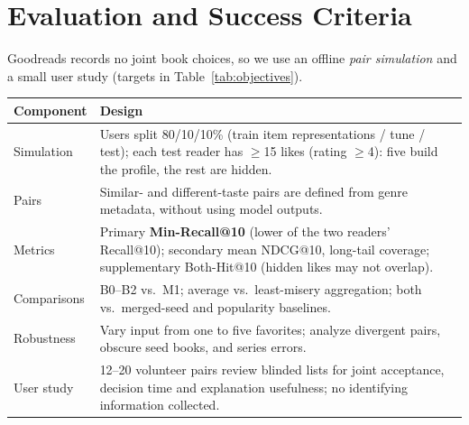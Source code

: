 \section*{Evaluation and Success Criteria}
Goodreads records no joint book choices, so we use an offline \emph{pair simulation} and a small user study (targets in Table~\ref{tab:objectives}).

{\tablestyle
\begin{xltabular}{\linewidth}{@{}L{2.0cm}Y@{}}
\toprule
\textbf{Component} & \textbf{Design} \\
\midrule
Simulation & Users split 80/10/10\% (train item representations / tune / test); each test reader has $\geq$15 likes (rating $\geq$4): five build the profile, the rest are hidden. \\
Pairs & Similar- and different-taste pairs are defined from genre metadata, without using model outputs. \\
Metrics & Primary \textbf{Min-Recall@10} (lower of the two readers' Recall@10); secondary mean NDCG@10, long-tail coverage; supplementary Both-Hit@10 (hidden likes may not overlap). \\
Comparisons & B0--B2 vs.\ M1; average vs.\ least-misery aggregation; both vs.\ merged-seed and popularity baselines. \\
Robustness & Vary input from one to five favorites; analyze divergent pairs, obscure seed books, and series errors. \\
User study & 12--20 volunteer pairs review blinded lists for joint acceptance, decision time and explanation usefulness; no identifying information collected. \\
\bottomrule
\end{xltabular}}
